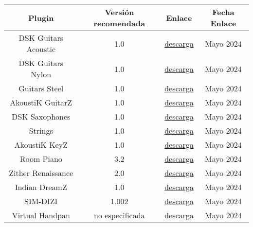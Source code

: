 \begin{table}[h]
    \centering
	\begin{tabular}{c|c|c|c}
		\textbf{Plugin} & \textbf{Versión recomendada} & \textbf{Enlace} & \textbf{Fecha Enlace} \\
		\hline\hline
		
            DSK Guitars Acoustic & 1.0 & \href{https://plugins4free.com/plugin/2010/}{descarga} & Mayo 2024\\
            
            DSK Guitars Nylon & 1.0 & \href{https://plugins4free.com/plugin/1087/}{descarga} & Mayo 2024\\
            
            Guitars Steel & 1.0 & \href{https://plugins4free.com/plugin/1088/}{descarga} & Mayo 2024\\
            
            AkoustiK GuitarZ & 1.0 & \href{https://plugins4free.com/plugin/335/}{descarga} & Mayo 2024\\
            
            DSK Saxophones & 1.0 & \href{https://plugins4free.com/plugin/2160/}{descarga} & Mayo 2024\\
            
            Strings & 1.0 & \href{https://plugins4free.com/plugin/355/}{descarga} & Mayo 2024\\
            
            AkoustiK KeyZ & 1.0 & \href{https://plugins4free.com/plugin/346/}{descarga} & Mayo 2024\\
             
            Room Piano & 3.2 & \href{https://www.samplescience.info/2020/12/room-piano.html}{descarga} & Mayo 2024\\
            
            Zither Renaissance & 2.0 & \href{https://www.samplescience.info/2022/09/zither-renaissance.html}{descarga} & Mayo 2024\\
            
            Indian DreamZ & 1.0 & \href{https://plugins4free.com/plugin/337/}{descarga} & Mayo 2024\\
            
            SIM-DIZI & 1.002 & \href{https://plugins4free.com/plugin/3664/}{descarga} & Mayo 2024\\
            
            Virtual Handpan  & no especificada & \href{https://www.samplescience.info/2023/10/virtual-handpan.html}{descarga} & Mayo 2024\\
            

\end{tabular}
\end{table}
